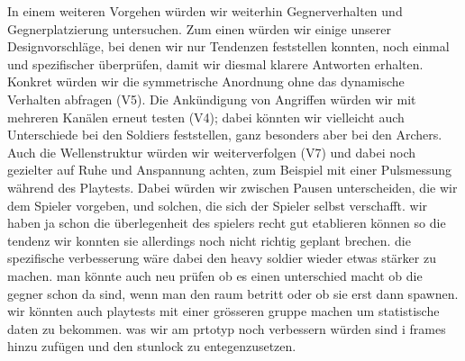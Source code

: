 \documentclass[../Main.tex]{subfiles}
\begin{document}
In einem weiteren Vorgehen würden wir weiterhin Gegnerverhalten und Gegnerplatzierung untersuchen. Zum einen würden wir einige unserer Designvorschläge, bei denen wir nur Tendenzen feststellen konnten, noch einmal und spezifischer überprüfen, damit wir diesmal klarere Antworten erhalten. Konkret würden wir die symmetrische Anordnung ohne das dynamische Verhalten abfragen (V5). Die Ankündigung von Angriffen würden wir mit mehreren Kanälen erneut testen (V4); dabei könnten wir vielleicht auch Unterschiede bei den Soldiers feststellen, ganz besonders aber bei den Archers. Auch die Wellenstruktur würden wir weiterverfolgen (V7) und dabei noch gezielter auf Ruhe und Anspannung achten, zum Beispiel mit einer Pulsmessung während des Playtests.\autocite[285--287]{drachen2018gamesuserresearch} Dabei würden wir zwischen Pausen unterscheiden, die wir dem Spieler vorgeben, und solchen, die sich der Spieler selbst verschafft. wir haben ja schon die überlegenheit des spielers recht gut etablieren können so die tendenz wir konnten sie allerdings noch nicht richtig geplant brechen. die spezifische verbesserung wäre dabei den heavy soldier wieder etwas stärker zu machen. man könnte auch neu prüfen ob es einen unterschied macht ob die gegner schon da sind, wenn man den raum betritt oder ob sie erst dann spawnen. wir könnten auch playtests mit einer grösseren gruppe machen um statistische daten zu bekommen. was wir am prtotyp noch verbessern würden sind i frames hinzu zufügen und den stunlock zu entegenzusetzen.
\end{document}
